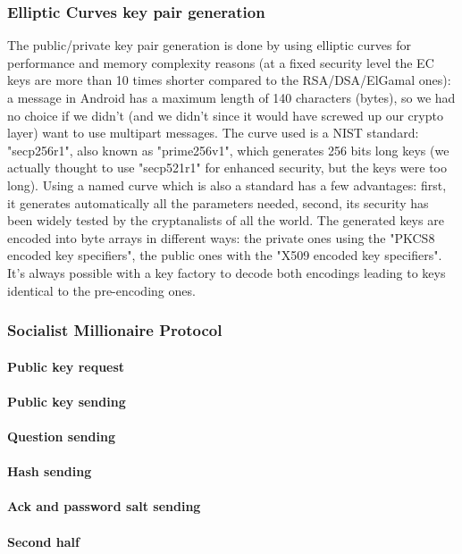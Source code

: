 \documentclass[a4paper,12pt]{article}
\begin{document}
\subsubsection{Elliptic Curves key pair generation}
The public/private key pair generation is done by using elliptic curves for performance and memory complexity reasons (at a fixed security level the EC keys are more than 10 times shorter compared to the RSA/DSA/ElGamal ones): a message in Android has a maximum length of 140 characters (bytes), so we had no choice if we didn't (and we didn't since it would have screwed up our crypto layer) want to use multipart messages. The curve used is a NIST standard: "secp256r1", also known as "prime256v1", which generates 256 bits long keys (we actually thought to use "secp521r1" for enhanced security, but the keys were too long). Using a named curve which is also a standard has a few advantages: first, it generates automatically all the parameters needed, second, its security has been widely tested by the cryptanalists of all the world. The generated keys are encoded into byte arrays in different ways: the private ones using the "PKCS8 encoded key specifiers", the public ones with the "X509 encoded key specifiers". It's always possible with a key factory to decode
both encodings leading to keys identical to the pre-encoding ones.
\subsubsection{Socialist Millionaire Protocol}
\paragraph{Public key request}
\paragraph{Public key sending}
\paragraph{Question sending}
\paragraph{Hash sending}
\paragraph{Ack and password salt sending}
\paragraph{Second half}
\end{document}
